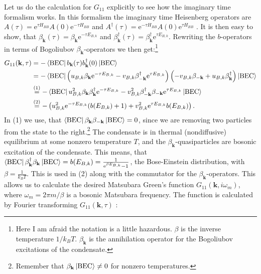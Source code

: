 Let us do the calculation for $G_{11}$ explicitly to see how the imaginary time formalism works. In this formalism the imaginary time Heisenberg operators are $A(\tau) = \text{e}^{\tau H_{BB}}A(0)\text{e}^{-\tau H_{BB}}$ and $A^\dagger(\tau) = \text{e}^{-\tau H_{BB}}A(0)\text{e}^{\tau H_{BB}}$ \cite{BruusFlensberg}. It is then easy to show, that $\beta_\mathbf{k}(\tau) = \beta_\mathbf{k}\text{e}^{-\tau E_{B,k}}$ and $\beta^\dagger_\mathbf{k}(\tau) = \beta^\dagger_\mathbf{k}\text{e}^{\tau E_{B,k}}$. Rewriting the $b$-operators in terms of Bogoliubov $\beta_\mathbf{k}$-operators we then get:\footnote{Here I am afraid the notation is a little hazardous. $\beta$ is the inverse temperature $1/k_BT$. $\beta_\mathbf{k}$ is the annihilation operator for the Bogoliubov excitations of the condensate.}
\begin{align}
G_{11}(\mathbf{k},\tau) &= -\bra{\text{BEC}} b_\mathbf{k}(\tau)b_\mathbf{k}^\dagger(0)\ket{\text{BEC}} \nonumber \\
&= -\bra{\text{BEC}} \left(u_{B,k}\beta_\mathbf{k}\text{e}^{-\tau E_{B,k}} - v_{B,k} \beta^\dagger_{-\mathbf{k}}\text{e}^{\tau E_{B,k}} \right)\left( -v_{B,k}\beta_{-\mathbf{k}} + u_{B,k} \beta^\dagger_{\mathbf{k}} \right)\ket{\text{BEC}} \nonumber \\
&\overset{(1)}{=} -\bra{\text{BEC}} u_{B,k}^2\beta_\mathbf{k}\beta^\dagger_\mathbf{k}\text{e}^{-\tau E_{B,k}} - v_{B,k}^2 \beta^\dagger_{-\mathbf{k}}\beta_{-\mathbf{k}}\text{e}^{\tau E_{B,k}} \ket{\text{BEC}} \nonumber \\
&\overset{(2)}{=} -\left(u_{B,k}^2 \text{e}^{-\tau E_{B,k}}(b(E_{B,k})+1)+ v_{B,k}^2\text{e}^{\tau E_{B,k}}b(E_{B,k})\right). \nonumber
\end{align}
In (1) we use, that $\bra{\text{BEC}}\beta_\mathbf{k}\beta_{-\mathbf{k}}\ket{\text{BEC}} = 0$, since we are removing two particles from the state to the right.\footnote{Remember that $\beta_\mathbf{k}\ket{\text{BEC}} \neq 0$ for nonzero temperatures.} The condensate is in thermal (nondiffusive) equilibrium at some nonzero temperature $T$, and the $\beta_\mathbf{k}$-quasiparticles are bosonic excitation of the condensate. This means, that $\bra{\text{BEC}}\beta_\mathbf{k}^\dagger\beta_{\mathbf{k}}\ket{\text{BEC}} = b(E_{B,k}) = \frac{1}{\text{e}^{\beta E_{B,k}}-1}$, the Bose-Einstein distribution, with $\beta = \frac{1}{k_BT}$. This is used in (2) along with the commutator for the $\beta_\mathbf{k}$-operators. This allows us to calculate the desired Matsubara Green's function $G_{11}(\mathbf{k},i\omega_m)$, where $\omega_m = 2\pi m/\beta$ is a bosonic Matsubara frequency. The function is calculated by Fourier transforming $G_{11}(\mathbf{k},\tau)$ \cite{BruusFlensberg}: 
